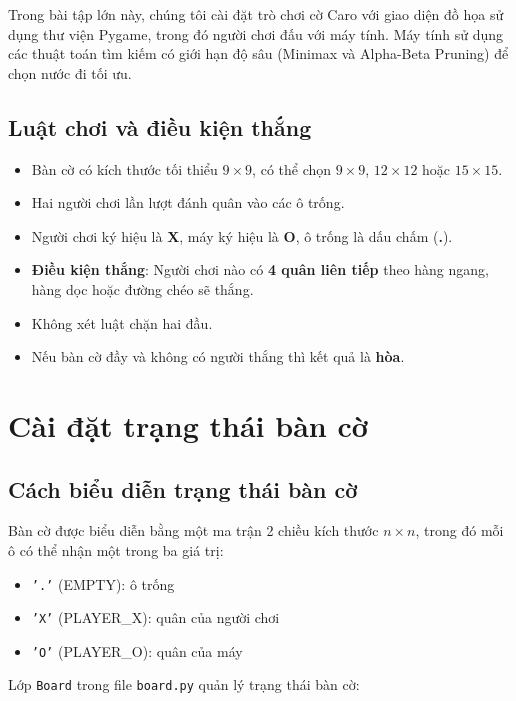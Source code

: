 \documentclass[12pt,a4paper]{article}
\begin{document}
Trong bài tập lớn này, chúng tôi cài đặt trò chơi cờ Caro với giao diện đồ họa sử dụng thư viện Pygame, trong đó người chơi đấu với máy tính. Máy tính sử dụng các thuật toán tìm kiếm có giới hạn độ sâu (Minimax và Alpha-Beta Pruning) để chọn nước đi tối ưu.

\subsection{Luật chơi và điều kiện thắng}

\begin{itemize}
    \item Bàn cờ có kích thước tối thiểu $9 \times 9$, có thể chọn $9 \times 9$, $12 \times 12$ hoặc $15 \times 15$.
    \item Hai người chơi lần lượt đánh quân vào các ô trống.
    \item Người chơi ký hiệu là \textbf{X}, máy ký hiệu là \textbf{O}, ô trống là dấu chấm (\textbf{.}).
    \item \textbf{Điều kiện thắng}: Người chơi nào có \textbf{4 quân liên tiếp} theo hàng ngang, hàng dọc hoặc đường chéo sẽ thắng.
    \item Không xét luật chặn hai đầu.
    \item Nếu bàn cờ đầy và không có người thắng thì kết quả là \textbf{hòa}.
\end{itemize}

\section{Cài đặt trạng thái bàn cờ}

\subsection{Cách biểu diễn trạng thái bàn cờ}

Bàn cờ được biểu diễn bằng một ma trận 2 chiều kích thước $n \times n$, trong đó mỗi ô có thể nhận một trong ba giá trị:

\begin{itemize}
    \item \texttt{'.'} (EMPTY): ô trống
    \item \texttt{'X'} (PLAYER\_X): quân của người chơi
    \item \texttt{'O'} (PLAYER\_O): quân của máy
\end{itemize}

Lớp \texttt{Board} trong file \texttt{board.py} quản lý trạng thái bàn cờ:
\end{document}
